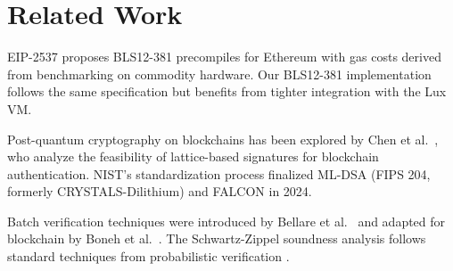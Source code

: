 \section{Related Work}
\label{sec:related}

EIP-2537 \cite{eip2537} proposes BLS12-381 precompiles for Ethereum with gas costs derived from benchmarking on commodity hardware. Our BLS12-381 implementation follows the same specification but benefits from tighter integration with the Lux VM.

Post-quantum cryptography on blockchains has been explored by Chen et al.\ \cite{chen2021pqblockchain}, who analyze the feasibility of lattice-based signatures for blockchain authentication. NIST's standardization process \cite{nistpqc2024} finalized ML-DSA (FIPS 204, formerly CRYSTALS-Dilithium) and FALCON in 2024.

Batch verification techniques were introduced by Bellare et al.\ \cite{bellare1998batch} and adapted for blockchain by Boneh et al.\ \cite{boneh2018compact}. The Schwartz-Zippel soundness analysis follows standard techniques from probabilistic verification \cite{schwartz1980fast}.

